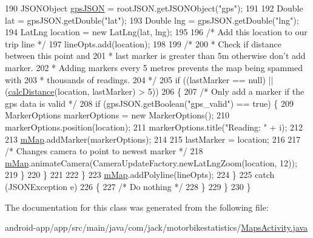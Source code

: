 \begin{DoxyCode}
190                     JSONObject \hyperlink{logging-device_8ino_a548727e041a5cd3db91bdbd0ccd71e30}{gpsJSON} = rootJSON.getJSONObject(\textcolor{stringliteral}{"gps"});
191 
192                     Double lat = gpsJSON.getDouble(\textcolor{stringliteral}{"lat"});
193                     Double lng = gpsJSON.getDouble(\textcolor{stringliteral}{"lng"});
194                     LatLng location = \textcolor{keyword}{new} LatLng(lat, lng);
195 
196                     \textcolor{comment}{/* Add this location to our trip line */}
197                     lineOpts.add(location);
198 
199                     \textcolor{comment}{/*}
200 \textcolor{comment}{                     * Check if distance between this point and}
201 \textcolor{comment}{                     * last marker is greater than 5m otherwise don't add marker.}
202 \textcolor{comment}{                     * Adding markers every 5 metres prevents the map being spammed with}
203 \textcolor{comment}{                     * thousands of readings.}
204 \textcolor{comment}{                     */}
205                     \textcolor{keywordflow}{if} ((lastMarker == null) || (\hyperlink{class_android_app_1_1_maps_activity_aea9b9fe75f1d70e3c902c8348823efd0}{calcDistance}(location, lastMarker) > 5))
206                     \{
207                         \textcolor{comment}{/* Only add a marker if the gps data is valid */}
208                         \textcolor{keywordflow}{if} (gpsJSON.getBoolean(\textcolor{stringliteral}{"gps\_valid"}) == \textcolor{keyword}{true}) \{
209                             MarkerOptions markerOptions = \textcolor{keyword}{new} MarkerOptions();
210                             markerOptions.position(location);
211                             markerOptions.title(\textcolor{stringliteral}{"Reading: "} + i);
212 
213                             \hyperlink{class_android_app_1_1_maps_activity_a373d4c770d2ab34538f9288d7c0e83ea}{mMap}.addMarker(markerOptions);
214 
215                             lastMarker = location;
216 
217                             \textcolor{comment}{/* Changes camera to point to newest marker */}
218                             \hyperlink{class_android_app_1_1_maps_activity_a373d4c770d2ab34538f9288d7c0e83ea}{mMap}.animateCamera(CameraUpdateFactory.newLatLngZoom(location, 12));
219                         \}
220                     \}
221 
222                 \}
223                 \hyperlink{class_android_app_1_1_maps_activity_a373d4c770d2ab34538f9288d7c0e83ea}{mMap}.addPolyline(lineOpts);
224             \}
225             \textcolor{keywordflow}{catch} (JSONException e)
226             \{
227                 \textcolor{comment}{/* Do nothing */}
228             \}
229         \}
230     \}
\end{DoxyCode}


The documentation for this class was generated from the following file\+:\begin{DoxyCompactItemize}
\item 
android-\/app/app/src/main/java/com/jack/motorbikestatistics/\hyperlink{_maps_activity_8java}{Maps\+Activity.\+java}\end{DoxyCompactItemize}
